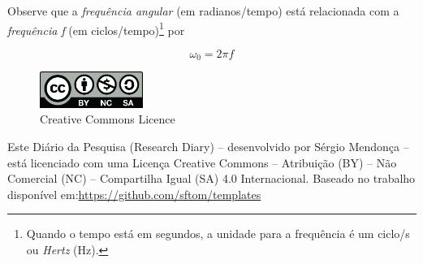 \documentclass[11pt,a4paper]{article}
\begin{document}
Observe que a \textit{frequência angular} (em radianos/tempo) está relacionada com a \textit{frequência f} (em ciclos/tempo)\footnote{Quando o tempo está em segundos, a unidade para a frequência é um ciclo/s ou \textit{Hertz} (Hz).} por

\begin{equation}
	\omega_{0} = 2\pi f
\end{equation}


\newpage
     \begin{figure}[ht]
          \centering
          \caption{\label{fig:by-nc-sa} Creative Commons Licence}
          \includegraphics[width=0.3\textwidth]{img/by-nc-sa.jpg}
      \end{figure} 
      Este Diário da Pesquisa (Research Diary) -- desenvolvido por Sérgio Mendonça -- está licenciado com uma Licença Creative Commons -- Atribuição (BY) -- Não Comercial (NC) -- Compartilha Igual (SA) 4.0 Internacional. Baseado no trabalho disponível em:\newline \href{https://github.com/sftom/templates}{https://github.com/sftom/templates}
\end{document}

